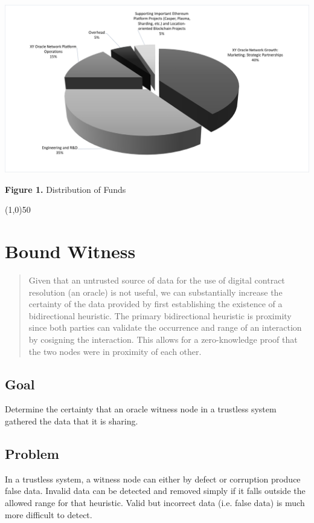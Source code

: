 \documentclass{article}
\begin{document}
\includegraphics[width=\textwidth] {Proceeds-6-white}
\begin{center}\textbf{Figure 1.}  Distribution of Funds
\end{center}

\begin{center}
\line(1,0){50}
\end{center}

\section {Bound Witness}
\begin{abstract}
Given that an untrusted source of data for the use of digital contract resolution (an \gls{oracle}) is not useful, we can substantially increase the \gls{certainty} of the data provided by first establishing the existence of a bidirectional \gls{heuristic}. The primary bidirectional heuristic is proximity since both parties can validate the occurrence and range of an interaction by cosigning the interaction. This allows for a zero-knowledge proof that the two nodes were in proximity of each other.
\end{abstract}

\subsection {Goal}
Determine the \gls{certainty} that an \gls{oracle} witness node in a trustless system gathered the data that it is sharing.

\subsection {Problem}
In a trustless system, a witness node can either by defect or corruption produce false data. Invalid data can be detected and removed simply if it falls outside the allowed range for that \gls{heuristic}. Valid but incorrect data (i.e. false data) is much more difficult to detect. 
\end{document}
